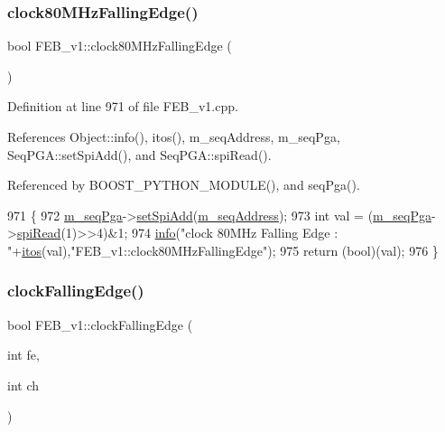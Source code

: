 \subsubsection{\texorpdfstring{clock80\+M\+Hz\+Falling\+Edge()}{clock80MHzFallingEdge()}}
{\footnotesize\ttfamily bool F\+E\+B\+\_\+v1\+::clock80\+M\+Hz\+Falling\+Edge (\begin{DoxyParamCaption}{ }\end{DoxyParamCaption})}



Definition at line 971 of file F\+E\+B\+\_\+v1.\+cpp.



References Object\+::info(), itos(), m\+\_\+seq\+Address, m\+\_\+seq\+Pga, Seq\+P\+G\+A\+::set\+Spi\+Add(), and Seq\+P\+G\+A\+::spi\+Read().



Referenced by B\+O\+O\+S\+T\+\_\+\+P\+Y\+T\+H\+O\+N\+\_\+\+M\+O\+D\+U\+L\+E(), and seq\+Pga().


\begin{DoxyCode}
971                                   \{
972   \hyperlink{classFEB__v1_a6c7804ac86796f233a8393043adf2e77}{m\_seqPga}->\hyperlink{classSeqPGA_ac998ce3a6d9b5f2e88cc8393f8c1df53}{setSpiAdd}(\hyperlink{classFEB__v1_a1c1eb093fd1733b9510fcf8bc5c7ad08}{m\_seqAddress});
973   \textcolor{keywordtype}{int} val = (\hyperlink{classFEB__v1_a6c7804ac86796f233a8393043adf2e77}{m\_seqPga}->\hyperlink{classSeqPGA_ab3d0e5e5d4014bc7a92588a76b8713d4}{spiRead}(1)>>4)&1;
974   \hyperlink{classObject_a644fd329ea4cb85f54fa6846484b84a8}{info}(\textcolor{stringliteral}{"clock 80MHz Falling Edge : "}+\hyperlink{Tools_8h_af330027dbdafb9a30768b3613c553e60}{itos}(val),\textcolor{stringliteral}{"FEB\_v1::clock80MHzFallingEdge"});
975   \textcolor{keywordflow}{return} (\textcolor{keywordtype}{bool})(val);
976 \}
\end{DoxyCode}
\mbox{\label{classFEB__v1_aa9f591714dce594562e3e959b105a580}} 
\subsubsection{\texorpdfstring{clock\+Falling\+Edge()}{clockFallingEdge()}}
{\footnotesize\ttfamily bool F\+E\+B\+\_\+v1\+::clock\+Falling\+Edge (\begin{DoxyParamCaption}\item[{int}]{fe,  }\item[{int}]{ch }\end{DoxyParamCaption})}



